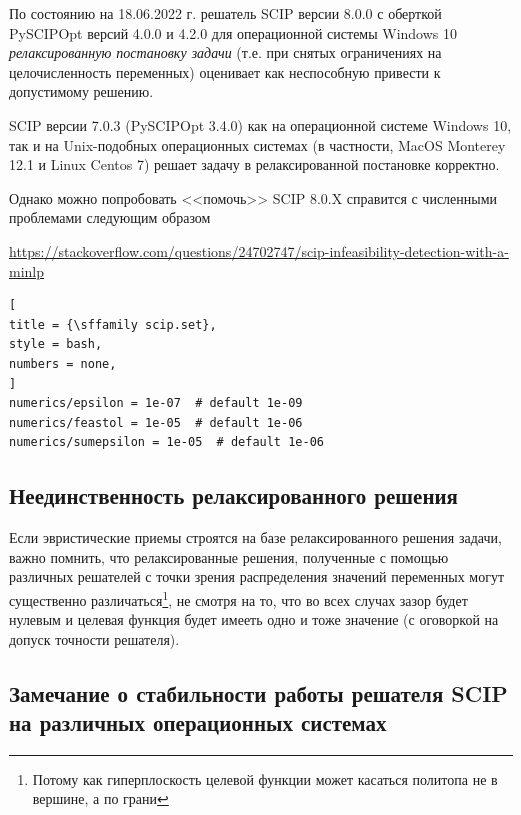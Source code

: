 \documentclass[%
	11pt,
	a4paper,
	utf8,
		]{article}
\begin{document}
По состоянию на 18.06.2022 г. решатель SCIP версии 8.0.0 с оберткой PySCIPOpt версий 4.0.0 и 4.2.0 для операционной системы Windows 10 \emph{релаксированную постановку задачи} (т.е. при снятых ограничениях на целочисленность переменных) оценивает как неспособную привести к допустимому решению.

SCIP версии 7.0.3 (PySCIPOpt 3.4.0) как на операционной системе Windows 10, так и на Unix-подобных операционных системах (в частности, MacOS Monterey 12.1 и Linux Centos 7) решает задачу в релаксированной постановке корректно.

Однако можно попробовать <<помочь>> SCIP 8.0.X справится с численными проблемами следующим образом

\noindent\url{https://stackoverflow.com/questions/24702747/scip-infeasibility-detection-with-a-minlp}
\begin{lstlisting}[
title = {\sffamily scip.set},
style = bash,
numbers = none,
]
numerics/epsilon = 1e-07  # default 1e-09
numerics/feastol = 1e-05  # default 1e-06
numerics/sumepsilon = 1e-05  # default 1e-06
\end{lstlisting}

\subsection{Неединственность релаксированного решения}

Если эвристические приемы строятся на базе релаксированного решения задачи, важно помнить, что релаксированные решения, полученные с помощью различных решателей с точки зрения распределения значений переменных могут существенно различаться\footnote{Потому как гиперплоскость целевой функции может касаться политопа не в вершине, а по грани}, не смотря на то, что во всех случах зазор будет нулевым и целевая функция будет имееть одно и тоже значение (с оговоркой на допуск точности решателя). 

\subsection{Замечание о стабильности работы решателя SCIP на различных операционных системах}
\end{document}
